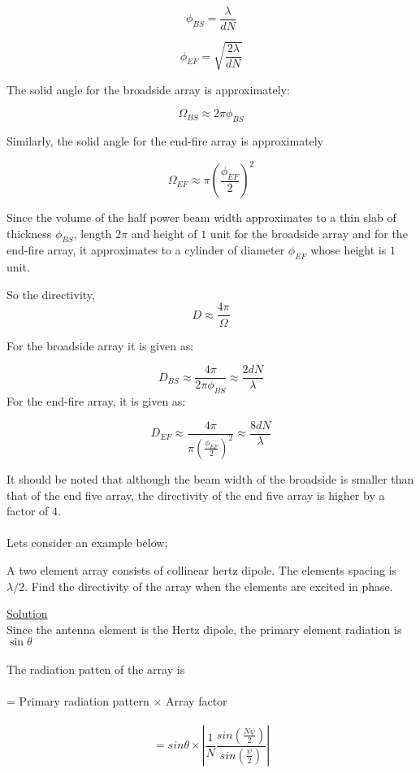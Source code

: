 $$
\phi_{BS} = \frac{\lambda}{dN}
$$

$$
\phi_{EF} = \sqrt{\frac{2 \lambda}{dN}}
$$

The solid angle for the broadside array is approximately:

$$
\Omega_{BS} \approx 2 \pi \phi_{BS}
$$

Similarly, the solid angle for the end-fire array is approximately

$$
\Omega_{EF} \approx  \pi (\frac{\phi_{EF}}{2})^2
$$

Since the volume of the half power beam width approximates to a thin slab of thickness $\phi_{BS}$, length $2\pi$ and height of $1$ unit for the broadside array and for the end-fire array, it approximates to a cylinder of diameter $\phi_{EF}$ whose height is $1$ unit.

So the directivity,
$$
D \approx \frac{4 \pi}{\Omega}
$$

For the broadside array it is given as:

\begin{equation}
D_{BS} \approx \frac{4 \pi}{2\pi\phi_{BS}} \approx \frac{2dN}{\lambda}
\end{equation}
For the end-fire array, it is given as:

\begin{equation}
D_{EF} \approx \frac{4 \pi}{\pi (\frac{\phi_{EF}}{2})^2} \approx \frac{8dN}{\lambda}
\end{equation}

It should be noted that although the beam width of the broadside
is smaller than that of the end five array, the directivity of the end five array is higher by a factor of $4$. \\ \\
Lets consider an example below;
\begin{exmp}
	A two element array consists of collinear hertz dipole. The elements spacing is $\lambda/2$. Find the directivity of the array when the elements are excited in phase. 
\end{exmp}
\underline{\centering Solution} \\ 
Since the antenna element is the Hertz dipole, the primary element radiation is $\sin\theta$ 
\paragraph*{} The radiation patten of the array is \\ \\
= Primary radiation pattern $\times$ Array factor \\ \\
\begin{equation*}
= sin\theta \times \left|\dfrac{1}{N} \dfrac{sin(\frac{N \psi}{2})}{sin(\frac{\psi}{2})}\right|
\end{equation*}


